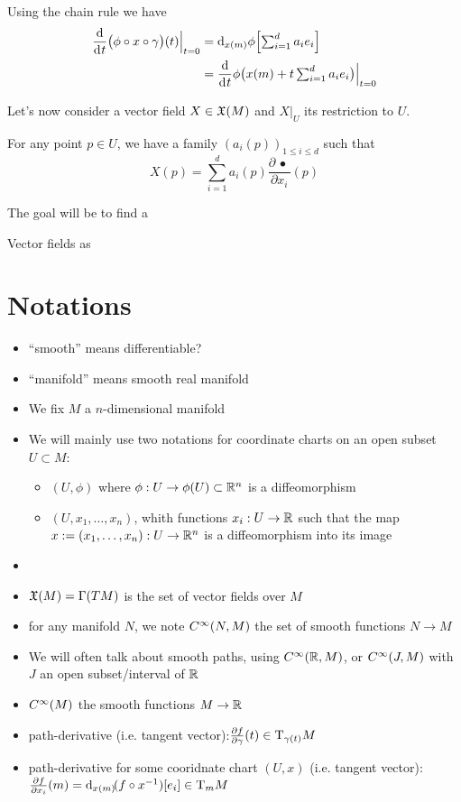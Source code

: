 		Using the chain rule we have
		\begin{align*}
			\frac{\d}{\di{t}} \big( \phi \circ x \circ \gamma \big)(t) \Big|_{t=0} &= \di[x(m)]{\phi} \Big[ {\textstyle\sum_{i=1}^d a_i e_i} \Big] \\
			                                                                       &= \frac{\d}{\di{t}} \phi\big( x(m) + {\textstyle t \sum_{i=1}^d a_i e_i} \big) \Big|_{t=0}
		\end{align*}

		Let's now consider a vector field $X \in \mathfrak{X}(M)$ and $X|_U$ its restriction to $U$.

		For any point $p \in U$, we have a family $(a_i(p))_{1 \leq i \leq d}$ such that
		$$
			X(p) = \sum_{i=1}^d a_i(p) \frac{\partial \,\bullet\,}{\partial{x_i}}(p)
		$$

		The goal will be to find a 

		Vector fields as 

\section{Notations}

	\begin{itemize}
		\item ``smooth'' means differentiable?
		\item ``manifold'' means smooth real manifold
		\item We fix $M$ a $n$-dimensional manifold
		\item We will mainly use two notations for coordinate charts on an open subset $U \subset M$:
			\begin{itemize}
				\item $(U, \phi)$ where $\phi: U \to \phi(U) \subset \mathbb{R}^n$ is a diffeomorphism
				\item $(U, x_1, \ldots, x_n)$, whith functions $x_i: U \to \mathbb{R}$ such that the map $x := (x_1, \ldots, x_n) : U \to \mathbb{R}^n$ is a diffeomorphism into its image
			\end{itemize}
		\item {}
		\item $\mathfrak{X}(M) = \Gamma(TM)$ is the set of vector fields over $M$
		\item for any manifold $N$, we note $C^\infty(N, M)$ the set of smooth functions $N \to M$ 
		\item We will often talk about smooth paths, using $C^\infty(\mathbb{R}, M)$, or $C^\infty(J, M)$ with $J$ an open subset/interval of $\mathbb{R}$
		\item $C^\infty(M)$ the smooth functions $M \to \mathbb{R}$
		\item path-derivative (i.e. tangent vector):$\frac{\partial{f}}{\partial{\gamma}}(t) \in \mathrm{T}_{\gamma(t)}{M}$
		\item path-derivative for some cooridnate chart $(U,x)$ (i.e. tangent vector): $\frac{\partial{f}}{\partial{x_i}}(m) = \di[x(m)](f \circ x^{-1})[e_i] \in \T_m{M}$
	\end{itemize}


